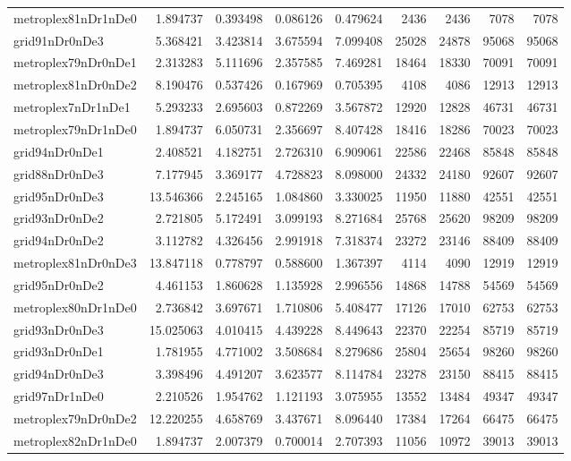 \begin{longtable}{|l|r|r|r|r|r|r|r|r|}
metroplex81nDr1nDe0 & 1.894737 & 0.393498 & 0.086126 & 0.479624 & 2436 & 2436 & 7078 & 7078 \\
grid91nDr0nDe3 & 5.368421 & 3.423814 & 3.675594 & 7.099408 & 25028 & 24878 & 95068 & 95068 \\
metroplex79nDr0nDe1 & 2.313283 & 5.111696 & 2.357585 & 7.469281 & 18464 & 18330 & 70091 & 70091 \\
metroplex81nDr0nDe2 & 8.190476 & 0.537426 & 0.167969 & 0.705395 & 4108 & 4086 & 12913 & 12913 \\
metroplex7nDr1nDe1 & 5.293233 & 2.695603 & 0.872269 & 3.567872 & 12920 & 12828 & 46731 & 46731 \\
metroplex79nDr1nDe0 & 1.894737 & 6.050731 & 2.356697 & 8.407428 & 18416 & 18286 & 70023 & 70023 \\
grid94nDr0nDe1 & 2.408521 & 4.182751 & 2.726310 & 6.909061 & 22586 & 22468 & 85848 & 85848 \\
grid88nDr0nDe3 & 7.177945 & 3.369177 & 4.728823 & 8.098000 & 24332 & 24180 & 92607 & 92607 \\
grid95nDr0nDe3 & 13.546366 & 2.245165 & 1.084860 & 3.330025 & 11950 & 11880 & 42551 & 42551 \\
grid93nDr0nDe2 & 2.721805 & 5.172491 & 3.099193 & 8.271684 & 25768 & 25620 & 98209 & 98209 \\
grid94nDr0nDe2 & 3.112782 & 4.326456 & 2.991918 & 7.318374 & 23272 & 23146 & 88409 & 88409 \\
metroplex81nDr0nDe3 & 13.847118 & 0.778797 & 0.588600 & 1.367397 & 4114 & 4090 & 12919 & 12919 \\
grid95nDr0nDe2 & 4.461153 & 1.860628 & 1.135928 & 2.996556 & 14868 & 14788 & 54569 & 54569 \\
metroplex80nDr1nDe0 & 2.736842 & 3.697671 & 1.710806 & 5.408477 & 17126 & 17010 & 62753 & 62753 \\
grid93nDr0nDe3 & 15.025063 & 4.010415 & 4.439228 & 8.449643 & 22370 & 22254 & 85719 & 85719 \\
grid93nDr0nDe1 & 1.781955 & 4.771002 & 3.508684 & 8.279686 & 25804 & 25654 & 98260 & 98260 \\
grid94nDr0nDe3 & 3.398496 & 4.491207 & 3.623577 & 8.114784 & 23278 & 23150 & 88415 & 88415 \\
grid97nDr1nDe0 & 2.210526 & 1.954762 & 1.121193 & 3.075955 & 13552 & 13484 & 49347 & 49347 \\
metroplex79nDr0nDe2 & 12.220255 & 4.658769 & 3.437671 & 8.096440 & 17384 & 17264 & 66475 & 66475 \\
metroplex82nDr1nDe0 & 1.894737 & 2.007379 & 0.700014 & 2.707393 & 11056 & 10972 & 39013 & 39013 \\

\end{longtable}

